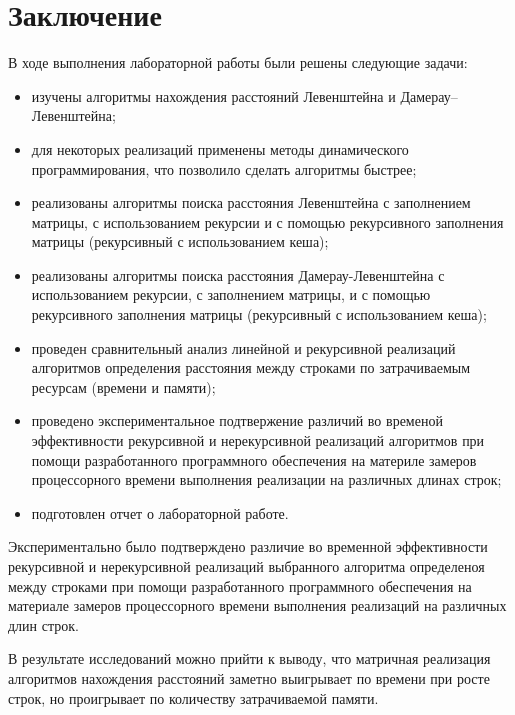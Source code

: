 \chapter*{Заключение}

В ходе выполнения лабораторной работы были решены следующие задачи:

\begin{itemize}
    \item изучены алгоритмы нахождения расстояний Левенштейна и Дамерау--Левенштейна;
	\item для некоторых реализаций применены методы динамического программирования, что позволило сделать алгоритмы быстрее;
	\item реализованы алгоритмы поиска расстояния Левенштейна с заполнением матрицы, с использованием рекурсии и с помощью рекурсивного заполнения матрицы (рекурсивный с использованием кеша);
	\item реализованы алгоритмы поиска расстояния Дамерау-Левенштейна с использованием рекурсии, с заполнением матрицы, и с помощью рекурсивного заполнения матрицы (рекурсивный с использованием кеша);
	\item проведен сравнительный анализ линейной и рекурсивной реализаций алгоритмов определения расстояния между строками по затрачиваемым ресурсам (времени и памяти);
	\item проведено экспериментальное подтвержение различий во временой эффективности рекурсивной и нерекурсивной реализаций алгоритмов при помощи разработанного программного обеспечения на материле замеров процессорного времени выполнения реализации на различных длинах строк;
	\item подготовлен отчет о лабораторной работе.
\end{itemize}

Экспериментально было подтверждено различие во временной эффективности рекурсивной и нерекурсивной реализаций выбранного алгоритма определеноя между строками при помощи разработанного программного обеспечения на материале замеров процессорного времени выполнения реализаций на различных длин строк.

В результате исследований можно прийти к выводу, что матричная реализация алгоритмов нахождения расстояний заметно выигрывает по времени при росте строк, но проигрывает по количеству затрачиваемой памяти.
